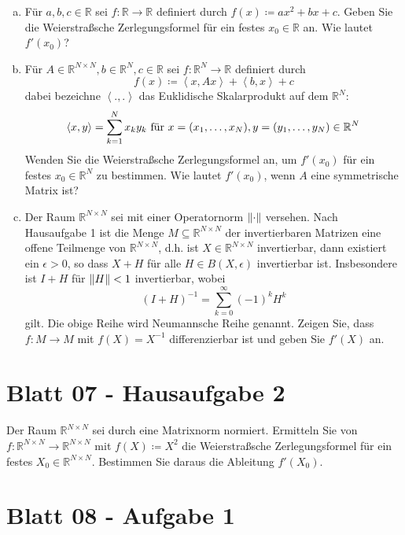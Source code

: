 \documentclass{scrreprt}
\begin{document}
\begin{enumerate}[a)]
\item Für $a, b, c \in \mathbb{R}$ sei $f \colon \mathbb{R} \to \mathbb{R}$
  definiert durch $f(x) \coloneqq ax^2 + bx + c$.
  Geben Sie die Weierstraßsche Zerlegungsformel für ein festes
  $x_0 \in \mathbb{R}$ an.
  Wie lautet $f'(x_0)$?

\item Für $A \in \mathbb{R}^{N \times N}, b \in \mathbb{R}^N, c \in \mathbb{R}$ sei
  $f \colon \mathbb{R}^N \to \mathbb{R}$ definiert durch
  \[
    f(x) \coloneqq \left\langle x, Ax \right\rangle + \left\langle b, x \right\rangle + c
  \]
  dabei bezeichne $\left\langle ., . \right\rangle$ das Euklidische Skalarprodukt auf dem $\mathbb{R}^N \colon$
  \[
    \left\langle x, y \right\rangle = \sum_{k = 1}^N x_k y_k \text{ für } x = \qty(x_1, \ldots, x_N), y = \qty(y_1, \ldots, y_N) \in \mathbb{R}^N
  \]
  Wenden Sie die Weierstraßsche Zerlegungsformel an, um $f'(x_0)$ für ein festes
  $x_0 \in \mathbb{R}^N$ zu bestimmen.
  Wie lautet $f'(x_0)$, wenn $A$ eine symmetrische Matrix ist?
\item Der Raum $\mathbb{R}^{N \times N}$ sei mit einer Operatornorm
  $\norm{\cdot}$ versehen.
  Nach Hausaufgabe 1 ist die Menge $M \subseteq \mathbb{R}^{N \times N}$ der
  invertierbaren Matrizen eine offene Teilmenge von $\mathbb{R}^{N \times N}$,
  d.h. ist $X \in \mathbb{R}^{N \times N}$ invertierbar, dann existiert ein
  $\epsilon > 0$, so dass $X + H$ für alle $H \in B(X, \epsilon)$
  invertierbar ist.
  Insbesondere ist $I + H$ für $\norm{H} < 1$ invertierbar, wobei
  \[
    (I + H)^{-1} = \sum_{k = 0}^{\infty}(-1)^k H^k
  \]
  gilt.
  Die obige Reihe wird Neumannsche Reihe genannt.
  Zeigen Sie, dass $f \colon M \to M$ mit $f(X) = X^{-1}$ differenzierbar ist
  und geben Sie $f'(X)$ an.

\end{enumerate}

\section{Blatt 07 - Hausaufgabe 2}

Der Raum $\mathbb{R}^{N \times N}$ sei durch eine
Matrixnorm normiert.
Ermitteln Sie von $f \colon \mathbb{R}^{N \times N} \to \mathbb{R}^{N \times N}$
mit $f(X) \coloneqq X^2$ die Weierstraßsche Zerlegungsformel für ein festes
$X_0 \in \mathbb{R}^{N \times N}$.
Bestimmen Sie daraus die Ableitung $f'(X_0)$.

\section{Blatt 08 - Aufgabe 1}
\end{document}
